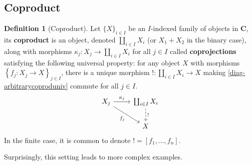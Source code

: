 \documentclass{article}
\theoremstyle{definition}
\newtheorem{defn}[thm]{Definition}
\theoremstyle{remark}
\begin{document}
\subsection{Coproduct}
\begin{defn}[Coproduct]
    Let $\{X\}_{i \in I}$ be an $I$-indexed family of objects in $\mathbf{C}$, its \textbf{coproduct} is an object, denoted $\coprod_{i \in I} X_i$ (or $X_1 + X_2$ in the binary case), along with morphisms $\kappa_j: X_j \rightarrow \coprod_{i \in I} X_i$ for all $j \in I$ called \textbf{coprojections} satisfying the following universal property: for any object $X$ with morphisms $\left\{ f_j: X_j \rightarrow X\right\}_{j\in I}$, there is a unique morphism $!: \coprod_{i \in I}X_i \rightarrow X$ making \eqref{diag-arbitrarycoproduniv} commute for all $j \in I$.
    \begin{equation}\label{diag-arbitrarycoproduniv}
        \begin{tikzcd}
        X_j  \arrow[r, "\kappa_j"] \arrow[rd, "f_j"'] &\coprod_{i \in I}X_i\arrow[d, "!", dashed]\\
        & X
        \end{tikzcd}
    \end{equation}
    In the finite case, it is common to denote $! = [f_1, \dots, f_n]$. %
\end{defn}
Surprisingly, this setting leads to more complex examples.
\end{document}
